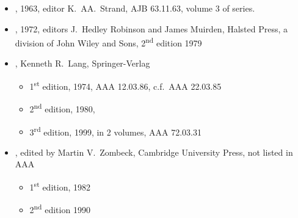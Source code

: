 \begin{itemize}
\item {}, 1963, editor K.\ AA.\ Strand, AJB
  63.11.63, volume 3 of  series.

\item {}, 1972, editors J.\ Hedley Robinson and
  James Muirden, Halsted Press, a division of John Wiley and Sons,
  2\textsuperscript{nd} edition 1979

\item {}, Kenneth R.\ Lang, Springer-Verlag
  \begin{itemize}
  \item 1\textsuperscript{st} edition, 1974, AAA 12.03.86, c.f.\ AAA 22.03.85
  \item 2\textsuperscript{nd} edition, 1980,
  \item 3\textsuperscript{rd} edition, 1999, in 2 volumes, AAA 72.03.31
  \end{itemize}
  
\item {}, edited by
  Martin V.\ Zombeck, Cambridge University Press, not listed in AAA
  \begin{itemize}
  \item 1\textsuperscript{st} edition, 1982
  \item 2\textsuperscript{nd} edition 1990
  \end{itemize}
  
\end{itemize}


